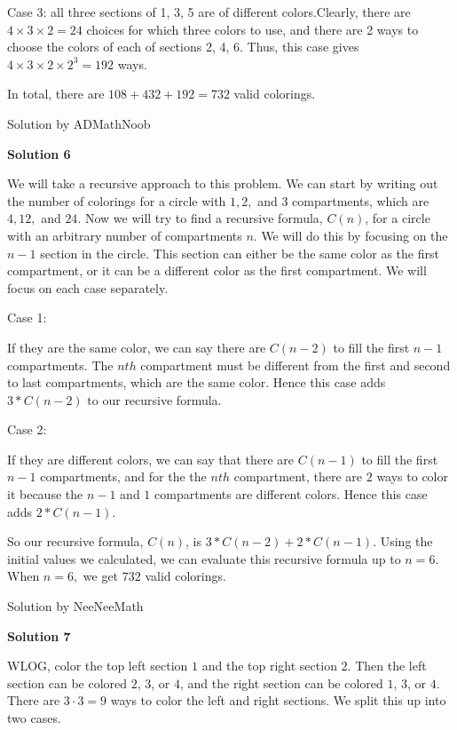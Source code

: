 \begin{enumerate}
 Case 3: all three sections of 1, 3, 5 are of different colors.Clearly, there are $4 \times 3 \times 2 = 24$ choices for which three colors to use, and there are 2 ways to choose the colors of each of sections 2, 4, 6. Thus, this case gives $4 \times 3 \times 2 \times 2^3 = 192$ ways.

 In total, there are $108 + 432 + 192 = \boxed{732}$ valid colorings.

 Solution by ADMathNoob

 



\textbf{Solution 6}

We will take a recursive approach to this problem. We can start by writing out the number of colorings for a circle with $1, 2,$ and $3$ compartments, which are $4, 12,$ and $24.$ Now we will try to find a recursive formula, $C(n)$, for a circle with an arbitrary number of compartments $n.$ We will do this by focusing on the $n-1$ section in the circle. This section can either be the same color as the first compartment, or it can be a different color as the first compartment. We will focus on each case separately.

 Case 1:

 If they are the same color, we can say there are $C(n-2)$ to fill the first $n-1$ compartments. The $nth$ compartment must be different from the first and second to last compartments, which are the same color. Hence this case adds $3*C(n-2)$ to our recursive formula.

 Case 2:

 If they are different colors, we can say that there are $C(n-1)$ to fill the first $n-1$ compartments, and for the the $nth$ compartment, there are $2$ ways to color it because the $n-1$ and $1$ compartments are different colors. Hence this case adds $2*C(n-1).$

 So our recursive formula, $C(n)$, is $3*C(n-2) + 2*C(n-1).$ Using the initial values we calculated, we can evaluate this recursive formula up to $n=6.$ When $n=6,$ we get $\boxed{732}$ valid colorings.

 Solution by NeeNeeMath

 



\textbf{Solution 7}

WLOG, color the top left section $1$ and the top right section $2$. Then the left section can be colored $2$, $3$, or $4$, and the right section can be colored $1$, $3$, or $4$. There are $3 \cdot 3 = 9$ ways to color the left and right sections. We split this up into two cases.


\end{enumerate}
